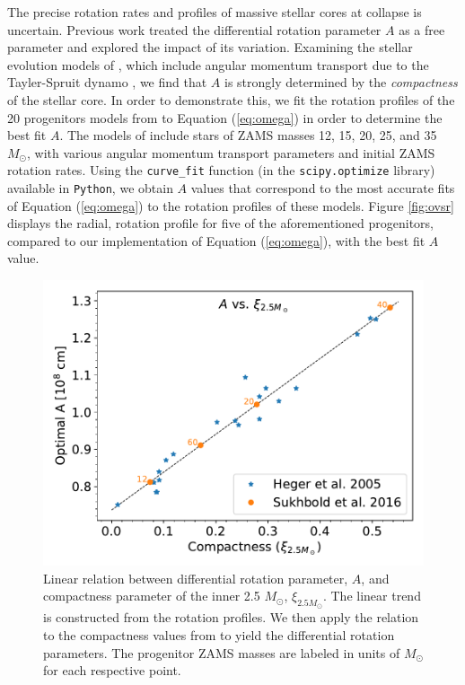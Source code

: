 \documentclass[twocolumn,times]{aastex62}  %
\begin{document}
The precise rotation rates and profiles of massive stellar cores at collapse is uncertain.
Previous work \citep[e.g.,][]{abdik:2014} treated the differential rotation parameter $A$ as a free parameter and explored the impact of its variation.
Examining the stellar evolution models of \citet{heger:2005}, which include angular momentum transport due to the Tayler-Spruit dynamo \citep{spruit:2002}, we find that $A$ is strongly determined by the {\it compactness} \citep{oconnor:2011} of the stellar core.
In order to demonstrate this, we fit the rotation profiles of the 20 progenitors models from \citet{heger:2005} to Equation (\ref{eq:omega}) in order to determine the best fit $A$.
The models of \citet{heger:2005} include stars of ZAMS masses 12, 15, 20, 25, and 35 $M_{\odot}$, with various angular momentum transport parameters and initial ZAMS rotation rates.  
Using the \texttt{curve\_fit} function (in the \texttt{scipy.optimize} library) available in \texttt{Python}, we obtain $A$ values that correspond to the most accurate fits of Equation (\ref{eq:omega}) to the rotation profiles of these models.  Figure \ref{fig:ovsr} displays the radial, rotation profile for five of the aforementioned progenitors, compared to our implementation of Equation (\ref{eq:omega}), with the best fit $A$ value.


\begin{figure}[t]
    \centering
    \includegraphics[scale=0.45]{figures/a_vs_compact.pdf}
    \caption{Linear relation between differential rotation parameter, $A$, and compactness parameter of the inner 2.5 $M_\odot$, $\xi_{2.5M_\odot}$.  The linear trend is constructed from the \citet{heger:2005} rotation profiles.  We then apply the relation to the compactness values from \citet{Suk:2016} to yield the differential rotation parameters.  The progenitor ZAMS masses are labeled in units of $M_\odot$ for each respective point.}
    \label{fig:a_vs_comp}
\end{figure}
\end{document}
